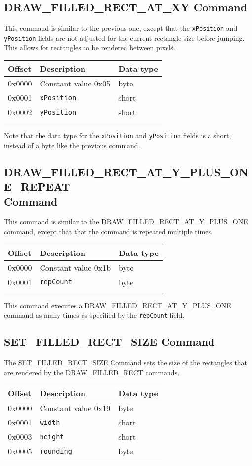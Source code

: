 \documentclass{article}
\newcommand{\field}[1]{\textcolor{fieldColor}{\texttt{#1}}}
\newenvironment{bytelisting}
{\ttfamily \begin{center} \begin{tabular}{l l l} Offset & Description & Data type \\ \hline}
{\normalfont \end{tabular} \end{center}}
\begin{document}
\subsection{DRAW\_FILLED\_RECT\_AT\_XY Command}
This command is similar to the previous one, except that the \field{xPosition} and \field{yPosition} fields are not adjusted for the current rectangle size before jumping.
This allows for rectangles to be rendered \"between pixels\".

\begin{bytelisting}
0x0000 & Constant value 0x05 & byte \\
0x0001 & \field{xPosition} & short \\
0x0002 & \field{yPosition} & short \\
\end{bytelisting}

Note that the data type for the \field{xPosition} and \field{yPosition} fields is a short, instead of a byte like the previous command.

\subsection{DRAW\_FILLED\_RECT\_AT\_Y\_PLUS\_ONE\_REPEAT \\ Command}
This command is similar to the DRAW\_FILLED\_RECT\_AT\_Y\_PLUS\_ONE command, except that that the command is repeated multiple times.

\begin{bytelisting}
0x0000 & Constant value 0x1b & byte \\
0x0001 & \field{repCount} & byte \\
\end{bytelisting}

This command executes a DRAW\_FILLED\_RECT\_AT\_Y\_PLUS\_ONE command as many times as specified by the \field{repCount} field.

\subsection{SET\_FILLED\_RECT\_SIZE Command}
The SET\_FILLED\_RECT\_SIZE Command sets the size of the rectangles that are rendered by the DRAW\_FILLED\_RECT commands.

\begin{bytelisting}
0x0000 & Constant value 0x19 & byte \\
0x0001 & \field{width} & short \\
0x0003 & \field{height} & short \\
0x0005 & \field{rounding} & byte \\
\end{bytelisting}
\end{document}
